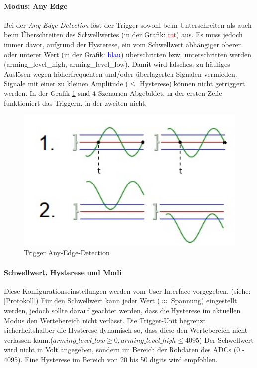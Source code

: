 \paragraph{Modus: Any Edge}
Bei der \textit{Any-Edge-Detection} löst der Trigger sowohl beim Unterschreiten als auch beim Überschreiten des Schwellwertes (in der Grafik: \textcolor{red}{rot}) aus. Es muss jedoch immer davor, aufgrund der Hysterese, ein vom Schwellwert abhängiger oberer oder unterer Wert (in der Grafik: \textcolor{blue}{blau}) überschritten bzw. unterschritten werden (arming\_level\_high, arming\_level\_low). Damit wird falsches, zu häufiges Auslösen wegen höherfrequenten und/oder überlagerten Signalen vermieden. Signale mit einer zu kleinen Amplitude ($\leq$ Hysterese) können nicht getriggert werden. In der Grafik \ref{anyEdge} sind 4 Szenarien Abgebildet, in der ersten Zeile funktioniert das Triggern, in der zweiten nicht.
\begin{figure}[h]
	\begin{center}
		\includegraphics[width=13cm]{SAUER/Grafiken/Trigger/TriggerEdgeAny.jpg}
		\caption{Trigger Any-Edge-Detection}
		\label{anyEdge}
	\end{center}
\end{figure}
\paragraph{Schwellwert, Hysterese und Modi}
Diese Konfigurationseinstellungen werden vom User-Interface vorgegeben. (siehe: \ref{Protokoll}) Für den Schwellwert kann jeder Wert ($\approx$ Spannung) eingestellt werden, jedoch sollte darauf geachtet werden, dass die Hysterese im aktuellen Modus den Wertebereich nicht verlässt. Die Trigger-Unit begrenzt sicherheitshalber die Hysterese dynamisch so, dass diese den Wertebereich nicht verlassen kann.($arming\_level\_low \geq 0, arming\_level\_high \leq 4095$) Der Schwellwert wird nicht in Volt angegeben, sondern im Bereich der Rohdaten des ADCs (0 - 4095).
Eine Hysterese im Bereich von 20 bis 50 digits wird empfohlen.
